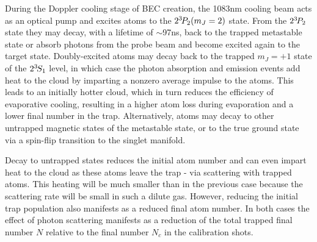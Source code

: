 	During the Doppler cooling stage of BEC creation, the 1083nm cooling beam acts as an optical pump and excites atoms to the $2^{3\!} P_2(m_J=2)$ state.
	From the $2^{3\!} P_2$ state they may decay, with a lifetime of $\sim$97ns, back to the trapped metastable state or absorb photons from the probe beam and become excited again to the target state.
	Doubly-excited atoms may decay back to the trapped $m_J=+1$ state of the $2^{3\!} S_1$ level, in which case the photon absorption and emission events add heat to the cloud by imparting a nonzero average impulse to the atoms.
	This leads to an initially hotter cloud, which in turn reduces the efficiency of evaporative cooling, resulting in a higher atom loss during evaporation and a lower final number in the trap. Alternatively, atoms may decay to other untrapped magnetic states of the metastable state, or to the true ground state via a spin-flip transition to the singlet manifold.

	Decay to untrapped states reduces the initial atom number and can even impart heat to the cloud as these atoms leave the trap - via scattering with trapped atoms.
	This heating will be much smaller than in the previous case because the scattering rate will be small in such a dilute gas.
	However, reducing the initial trap population also manifests as a reduced final atom number.
	In both cases the effect of photon scattering manifests as a reduction of the total trapped final number $N$ relative to the final number $N_c$ in the calibration shots.

